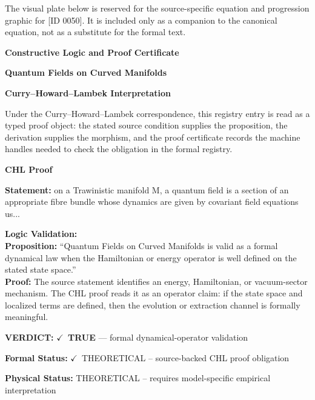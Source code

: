 \begingroup\footnotesize\sloppy
The visual plate below is reserved for the source-specific equation and progression graphic for [ID 0050]. It is included only as a companion to the canonical equation, not as a substitute for the formal text.
\par\endgroup
\ifTZPDarkEdition
{}
\fi

\clearpage
\begingroup\tzpsupportsetup
\noindent\textbf{\fontsize{10.8pt}{12.8pt}\selectfont [ID 0050] Constructive Logic and Proof Certificate}\par
\noindent\textbf{\fontsize{10pt}{12pt}\selectfont Quantum Fields on Curved Manifolds}\par
\vspace{0.45em}
\begingroup
\footnotesize
\setlength{\parskip}{0.22em}
\setlength{\parindent}{0pt}
\noindent\textbf{Curry--Howard--Lambek Interpretation}\par
Under the Curry--Howard--Lambek correspondence, this registry entry is read as a typed proof
object: the stated source condition supplies the proposition, the derivation supplies the
morphism, and the proof certificate records the machine handles needed to check the obligation
in the formal registry.

\vspace{0.45em}
\noindent\textbf{CHL Proof}\par
\textbf{Statement:} on a Trawinistic manifold M, a quantum field is a section of an appropriate fibre
bundle whose dynamics are given by covariant field equations us...

\textbf{Logic Validation:}\\
\textbf{Proposition:} ``Quantum Fields on Curved Manifolds is valid as a formal dynamical law when the
Hamiltonian or energy operator is well defined on the stated state space.''\\
\textbf{Proof:} The source statement identifies an energy, Hamiltonian, or vacuum-sector mechanism. The
CHL proof reads it as an operator claim: if the state space and localized terms are
defined, then the evolution or extraction channel is formally meaningful.

\textbf{VERDICT:} \ensuremath{\checkmark}\ \textbf{TRUE} --- formal dynamical-operator validation

\textbf{Formal Status:} \ensuremath{\checkmark}\ THEORETICAL -- source-backed CHL proof obligation

\textbf{Physical Status:} THEORETICAL -- requires model-specific empirical interpretation
\par\vspace{0.45em}
\par
\ifTZPDarkEdition
{}
\fi
\endgroup
\endgroup
